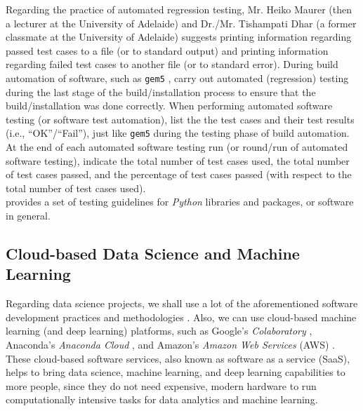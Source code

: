 \documentclass[letter,12pt]{article}
\begin{document}
Regarding the practice of automated regression testing, Mr. Heiko Maurer (then a lecturer at the University of Adelaide) and Dr./Mr. Tishampati Dhar (a former classmate at the University of Adelaide) suggests printing information regarding passed test cases to a file (or to standard output) and printing information regarding failed test cases to another file (or to standard error). During build automation of software, such as {\tt gem5} \cite{gem5developers2014,Binkert2011}, carry out automated (regression) testing during the last stage of the build/installation process to ensure that the build/installation was done correctly. When performing automated software testing (or software test automation), list the the test cases and their test results (i.e., ``OK''/``Fail''), just like {\tt gem5} during the testing phase of build automation. At the end of each automated software testing run (or round/run of automated software testing), indicate the total number of test cases used, the total number of test cases passed, and the percentage of test cases passed (with respect to the total number of test cases used). \\


\cite[\S Testing Guidelines]{TheSciPyCommunity2019c} provides a set of testing guidelines for {\it Python} libraries and packages, or software in general.





\subsection{Cloud-based Data Science and Machine Learning}
\label{ssec:CloudBasedDataScienceAndMachineLearning}

Regarding data science projects, we shall use a lot of the aforementioned software development practices and methodologies \cite{Cady2017}. Also, we can use cloud-based machine learning (and deep learning) platforms, such as Google's {\it Colaboratory} \cite{GoogleColabStaff2019}, Anaconda's {\it Anaconda Cloud} \cite{AnacondaStaff2019}, and Amazon's {\it Amazon Web Services} (AWS) \cite{AmazonWebServicesStaff2019}. These cloud-based software services, also known as software as a service (SaaS), helps to bring data science, machine learning, and deep learning capabilities to more people, since they do not need expensive, modern hardware to run computationally intensive tasks for data analytics and machine learning.
\end{document}
